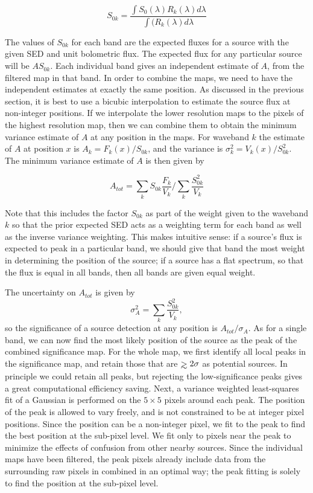 \documentclass[useAMS,usenatbib]{mn2e}
\def\gtrsim{\mathrel{\hbox{\rlap{\hbox{\lower4pt\hbox{$\sim$}}}\hbox{$>$}}}}
\begin{document}
$$ S_{0k} = \frac{\int S_{0}(\lambda) R_k(\lambda) d\lambda } {\int( R_k(\lambda)
  d\lambda } $$ 

The values of $S_{0k}$ for each band are the expected fluxes for a
source with the given SED and unit bolometric flux. The expected flux
for any particular source will be $AS_{0k}$. Each individual band
gives an independent estimate of $A$, from the filtered map in that
band. In order to combine the maps, we need to have the independent
estimates at exactly the same position. As discussed in the previous
section, it is best to use a bicubic interpolation to estimate the
source flux at non-integer positions. If we interpolate the lower
resolution maps to the pixels of the highest resolution map, then we
can combine them to obtain the minimum variance estimate of $A$ at any
position in the maps.  For waveband $k$ the estimate of $A$ at
position $x$ is $A_k = F_k(x)/S_{0k}$, and the variance is
$\sigma_{k}^2 = V_k(x)/S_{0k}^2$.  The minimum variance estimate of
$A$ is then given by

$$ A_{tot} = \sum_k{S_{0k}\frac{F_k}{V_k}} \Big/ \sum_k{\frac{S_{0k}^2}{V_k}}$$ 

Note that this includes the factor $S_{0k}$ as part of the weight
given to the waveband $k$ so that the prior expected SED acts as a
weighting term for each band as well as the inverse variance
weighting. This makes intuitive sense: if a source's flux is expected
to peak in a particular band, we should give that band the most weight
in determining the position of the source; if a source has a flat
spectrum, so that the flux is equal in all bands, then all bands are
given equal weight.

The uncertainty on $A_{tot}$ is given by
$$ \sigma_A^2 = \sum_k{\frac{S_{0k}^2}{V_k}},$$ so the significance
of a source detection at any position is $A_{tot}/\sigma_A $. As for a
single band, we can now find the most likely position of the source as
the peak of the combined significance map.  For the whole map, we
first identify all local peaks in the significance map, and retain
those that are $\gtrsim 2\sigma$ as potential sources.  In principle we
could retain all peaks, but rejecting the low-significance peaks gives
a great computational efficiency saving. Next, a variance weighted
least-squares fit of a Gaussian is performed on the $5\times 5$ pixels
around each peak. The position of the peak is allowed to vary freely,
and is not constrained to be at integer pixel positions.  Since the
position can be a non-integer pixel, we fit to the peak to find the
best position at the sub-pixel level.  We fit only to pixels near the
peak to minimize the effects of confusion from other nearby
sources. Since the individual maps have been filtered, the peak pixels
already include data from the surrounding raw pixels in combined in an
optimal way; the peak fitting is solely to find the position at the
sub-pixel level.
\end{document}
